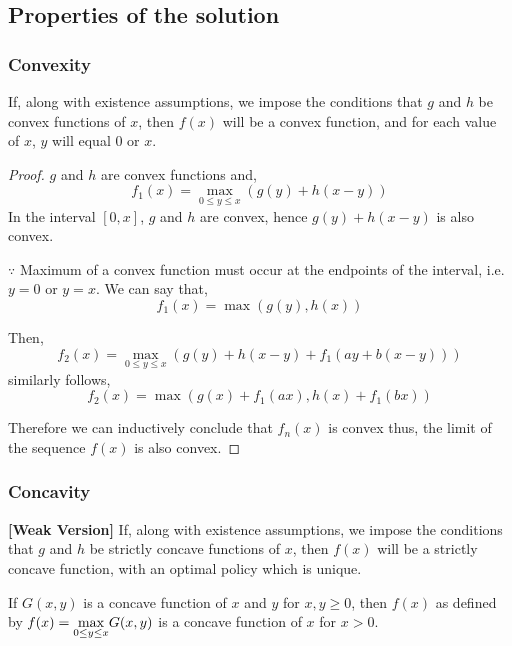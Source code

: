 \subsection{Properties of the solution}
\subsubsection{Convexity}

\begin{theorem} If, along with existence assumptions, we impose
the conditions that $g$ and $h$ be convex functions of $x$, then $f(x)$ will be a
convex function, and for each value of $x$, $y$ will equal 0 or $x$.
\end{theorem}

\begin{proof}
    $g$ and $h$ are convex functions and, 
    $$f_1(x) = \max_{0 \le y \le x}(g(y) + h(x-y))$$
    In the interval $[0, x]$, $g$ and $h$ are convex, hence $g(y) + h(x-y)$ is also convex.

    $\because$ Maximum of a convex function must occur at the endpoints of the interval, i.e. $y=0$ or $y=x$. We can say that, 
    $$f_1(x) = \max(g(y), h(x))$$

    Then, 
    $$f_2(x) = \max_{0 \le y \le x}(g(y) + h(x-y) + f_1(ay + b(x-y)))$$
    similarly follows,
    $$f_2(x) = \max(g(x) + f_1(ax), h(x) + f_1(bx))$$

    Therefore we can inductively conclude that $f_n(x)$ is convex thus, the limit of the sequence $f(x)$ is also convex.
\end{proof}

\subsubsection{Concavity}
\begin{theorem}
    \textbf{[Weak Version]} If, along with existence assumptions, we impose the conditions that $g$ and $h$ be strictly concave functions of $x$, then $f(x)$ will be a strictly concave function, with an optimal policy which is unique.
\end{theorem}

\begin{lemma} If $G(x, y)$ is a concave function of $x$ and $y$ for $x, y \ge 0$, then $f(x)$ as defined by $f(x) = \mathlarger{\max}_{0 \le y \le x} G(x, y)$ is a concave function of $x$ for $x > 0$.
\end{lemma}

